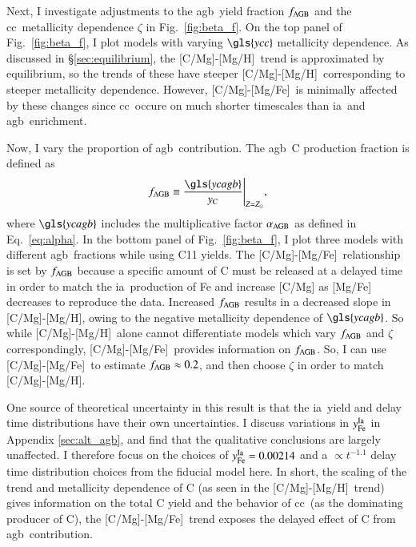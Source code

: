 \documentclass[12pt,oneside,letterpaper]{report}
\newcommand{\cc}{\gls{cc}}
\newcommand{\agb}{\gls{agb}}
\newcommand{\ia}{\gls{ia}}
\newcommand{\Ycc}{\gls{ycc}}
\newcommand{\Yct}{\ensuremath{y_{\rm C}}}
\newcommand{\Ycagb}{\gls{ycagb}}
\newcommand{\caah}{[C/Mg]-[Mg/H]}
\newcommand{\caafe}{[C/Mg]-[Mg/Fe]}
\begin{document}
Next, I investigate adjustments to the \agb\ yield fraction $f_{\rm AGB}$ and the \cc\ metallicity dependence $\zeta$ in Fig.~\ref{fig:beta_f}. On the top panel of Fig.~\ref{fig:beta_f}, I plot models with varying $\Ycc$ metallicity dependence. As discussed in \S\ref{sec:equilibrium}, the \caah~trend is approximated by equilibrium, so the trends of these have steeper \caah~corresponding to steeper metallicity dependence. However, \caafe~is minimally affected by these changes since \cc\ occure on much shorter timescales than \ia\ and \agb\ enrichment.

Now, I vary the proportion of \agb\ contribution.  The \agb\ C production fraction is defined as
\begin{equation}
    f_{\rm AGB} \equiv \frac{\Ycagb}{\Yct}\Bigg\vert_{Z=Z_\odot},
\end{equation}
where  $\Ycagb$ includes the multiplicative factor $\alpha_{\rm AGB}$ as defined in Eq.~\ref{eq:alpha}.
In the bottom panel of Fig.~\ref{fig:beta_f}, I plot three models with different \agb\ fractions while using C11 yields.  The \caafe~relationship is set by $f_{\rm AGB}$ because a specific amount of C must be released at a delayed time in order to match the \ia\ production of Fe and increase [C/Mg] as [Mg/Fe] decreases to reproduce the data.
Increased $f_{\rm AGB}$ results in a decreased slope in \caah, owing to the negative metallicity dependence of $\Ycagb$. So while \caah~alone cannot differentiate models which vary $f_{\rm AGB}$ and $\zeta$ correspondingly, \caafe~provides information on $f_{\rm AGB}$. So, I can use \caafe~to estimate $f_{\rm AGB}\approx 0.2$, and then choose $\zeta$ in order to match \caah.

One source of theoretical uncertainty in this result is that the \ia\ yield and delay time distributions have their own uncertainties. I discuss variations in $y_{\rm Fe}^{\rm Ia}$ in Appendix \ref{sec:alt_agb}, and find that the qualitative conclusions are largely unaffected. I therefore focus on the choices of $y_{\rm Fe}^{\rm Ia} = 0.00214$ and a $\propto t^{-1.1}$ delay time distribution choices from the fiducial model here.
In short, the scaling of the trend and metallicity dependence of C (as seen in
the \caah\ trend) gives information on the total C yield and the behavior of \cc\ (as the dominating producer of C), the \caafe\ trend exposes the delayed effect of C from \agb\ contribution.
\end{document}
